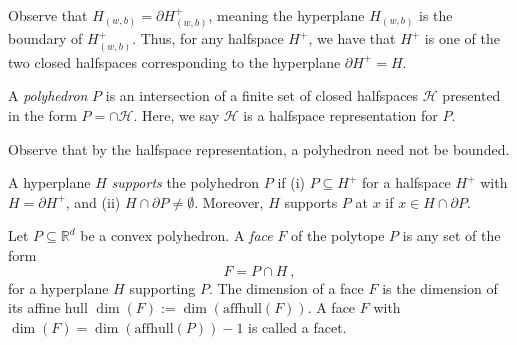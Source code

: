 \documentclass[twoside,11pt]{article}
\newcommand{\reals}{\mathbb{R}}
\newcommand{\affhull}{\mathrm{affhull}}
\renewcommand{\H}{\mathcal{H}}
\newcommand{\inprod}[2]{\langle #1, #2 \rangle}%
\begin{document}
Observe that $H_{(w,b)} = \partial H^+_{(w,b)}$, meaning the hyperplane $H_{(w,b)}$ is the boundary of $H^+_{(w,b)}$.
Thus, for any halfspace $H^+$, we have that $H^+$ is one of the two closed halfspaces corresponding to the hyperplane $\partial H^+ = H$.


\begin{definition}
	A \emph{polyhedron} $P$ is an intersection of a finite set of closed halfspaces $\H$
  presented in the form $P = \cap \H$.
  Here, we say $\H$ is a halfspace representation for $P$.
\end{definition}

\noindent
Observe that by the halfspace representation, a polyhedron need not be bounded.


\begin{definition}[Supports]
	A hyperplane $H$ \emph{supports} the polyhedron $P$ if 
	(i) $P \subseteq H^+$ for a halfspace $H^+$ with $H = \partial H^+$, and
	(ii) $H \cap \partial P \neq \emptyset$.
	Moreover, $H$ supports $P$ at $x$ if $x \in H \cap \partial P$.
\end{definition}


\begin{definition}\label{def:face}
  Let $P \subseteq \reals^d$ be a convex polyhedron.
  A \emph{face} $F$ of the polytope $P$ is any set of the form
  \begin{equation*}
    F = P \cap H~,
  \end{equation*}
  for a hyperplane $H$ supporting $P$.
  The dimension of a face $F$ is the dimension of its affine hull $\dim(F) := \dim(\affhull(F))$.
  A face $F$ with $\dim(F) = \dim(\affhull(P)) - 1$ is called a facet.
\end{definition}
\end{document}
